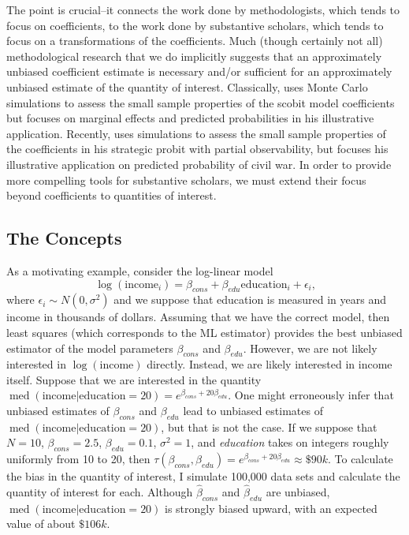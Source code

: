 \documentclass[12pt]{article}
\DeclareMathOperator{\med}{med}
\begin{document}
The point is crucial--it connects the work done by methodologists, which tends to focus on coefficients, to the work done by substantive scholars, which tends to focus on a transformations of the coefficients. Much (though certainly not all) methodological research that we do implicitly suggests that an approximately unbiased coefficient estimate is necessary and/or sufficient for an approximately unbiased estimate of the quantity of interest. Classically, \cite{Nagler1994} uses Monte Carlo simulations to assess the small sample properties of the scobit model coefficients but focuses on marginal effects and predicted probabilities in his illustrative application. Recently, \cite{Nieman2015} uses simulations to assess the small sample properties of the coefficients in his strategic probit with partial observability, but focuses his illustrative application on predicted probability of civil war. In order to provide more compelling tools for substantive scholars, we must extend their focus beyond coefficients to quantities of interest.

\subsection*{The Concepts}

As a motivating example, consider the log-linear model 
\begin{equation}
\log (\text{income}_i) = \beta_{cons} + \beta_{edu} \text{education}_i + \epsilon_i \text{,}\nonumber
\end{equation}
where $\epsilon_i \sim N(0, \sigma^2)$ and we suppose that education is measured in years and income in thousands of dollars. Assuming that we have the correct model, then least squares (which corresponds to the ML estimator) provides the best unbiased estimator of the model parameters $\beta_{cons}$ and $\beta_{edu}$. However, we are not likely interested in $\log(\text{income})$ directly. Instead, we are likely interested in income itself. Suppose that we are interested in the quantity $\med(\text{income} | \text{education} = 20) = e^{\beta_{cons} + 20\beta_{edu}}$. One might erroneously infer that unbiased estimates of $\beta_{cons}$ and $\beta_{edu}$ lead to unbiased estimates of $\med(\text{income} | \text{education} = 20)$, but that is not the case. If we suppose that $N = 10$, $\beta_{cons} = 2.5$, $\beta_{edu} = 0.1$, $\sigma^2 = 1$, and \textit{education} takes on integers roughly uniformly from 10 to 20, then $\tau(\beta_{cons}, \beta_{edu}) = e^{\beta_{cons} + 20\beta_{edu}} \approx \$90k$. To calculate the bias in the quantity of interest, I simulate 100,000 data sets and calculate the quantity of interest for each. Although $\hat{\beta}_{cons}$ and $\hat{\beta}_{edu}$ are unbiased, $\med(\text{income} | \text{education} = 20)$ is strongly biased upward, with an expected value of about $\$106k$.
\end{document}

